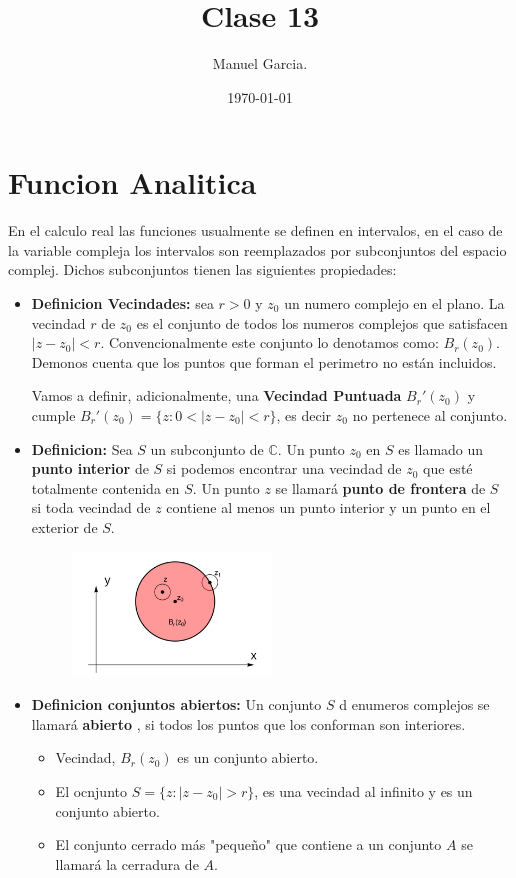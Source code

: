 \documentclass{article}
\title{Clase 13}
\author{Manuel Garcia.}
\date{\today}
\begin{document}
\maketitle

\section{Funcion Analitica }
En el calculo real las funciones usualmente se definen en intervalos, en el caso de la variable compleja los intervalos son reemplazados por subconjuntos del espacio complej. Dichos subconjuntos tienen las siguientes propiedades: 
\begin{itemize}
  \item \textbf{Definicion Vecindades: } sea $ r > 0  $ y $ z_0 $ un numero complejo en el plano. La vecindad $ r  $ de $ z_0  $ es el conjunto de todos los numeros complejos que satisfacen $ \left|z-z_0\right|<r  $. Convencionalmente este conjunto lo denotamos como: $ B_r(z_0 ) $. Demonos cuenta que los puntos que forman el perimetro no están incluidos. 

    Vamos a definir, adicionalmente, una \textbf{Vecindad Puntuada} $ B_r'(z_0 ) $ y cumple  $ B_r' (z_0) = \{z : 0<\left|z-z_0 \right|<r \} $, es decir $ z_0 $ no pertenece al conjunto.
  \item \textbf{Definicion: } Sea $ S  $ un subconjunto de $ \mathbb{C} $. Un punto $ z_0  $ en $ S  $ es llamado un \textbf{punto interior} de $ S  $ si podemos encontrar una vecindad de $ z_0  $ que esté totalmente contenida en $ S  $. Un punto $ z  $ se llamará \textbf{punto de frontera} de $ S  $ si toda vecindad de $ z  $ contiene al menos un punto interior y un punto en el exterior de $ S  $.
  \begin{figure}[H]
    \begin{center}
      \includegraphics[width=0.5\textwidth]{frontera.png}
    \end{center}
  \end{figure}

  \item \textbf{Definicion conjuntos abiertos: } Un conjunto $S  $ d enumeros complejos se llamará \textbf{abierto }, si todos los puntos que los conforman son interiores. 
  \begin{itemize}
    \item Vecindad, $ B_r(z_0) $ es un conjunto abierto. 
    \item El ocnjunto $S = \{z: \left|z-z_0 \right|>r\}$, es una vecindad al infinito y es un conjunto abierto. 
    \item El conjunto cerrado más "pequeño" que contiene a un conjunto $ A  $ se llamará la cerradura de $ A  $. 


\end{itemize}
\end{itemize}
\end{document}
